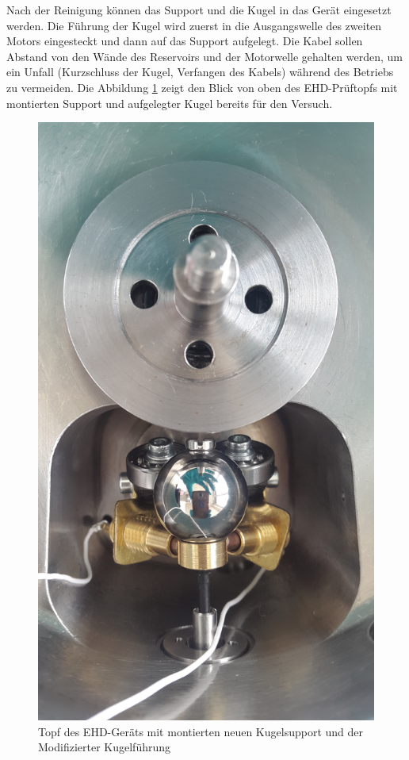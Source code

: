 Nach der Reinigung können das Support und die Kugel in das Gerät eingesetzt werden.
Die Führung der Kugel wird zuerst in die Ausgangswelle des zweiten Motors eingesteckt und dann auf das Support aufgelegt.
Die Kabel sollen Abstand von den Wände des Reservoirs und der Motorwelle gehalten werden, um ein Unfall (Kurzschluss der Kugel, Verfangen des Kabels) während des Betriebs zu vermeiden.
Die Abbildung \ref{fig:ehd_topf_mit_kugel_und_support} zeigt den Blick von oben des EHD-Prüftopfs mit montierten Support und aufgelegter Kugel bereits für den Versuch.
\begin{figure}[htb]
    \centering
    \includegraphics[width=0.8\linewidth]{./images/ehd_topf_mit_kugel_und_support.jpg}
    \caption{Topf des EHD-Geräts mit montierten neuen Kugelsupport und der Modifizierter Kugelführung}
    \label{fig:ehd_topf_mit_kugel_und_support}
\end{figure}

